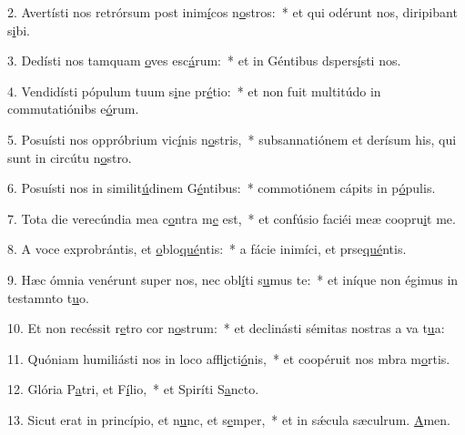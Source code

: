 2. Avertísti nos retrórsum post inim\uline{í}cos n\uline{o}stros:~* et qui odérunt nos, diripibant s\uline{i}bi.\par 
3. Dedísti nos tamquam \uline{o}ves esc\uline{á}rum:~* et in Géntibus dspers\uline{í}sti nos.\par 
4. Vendidísti pópulum tuum s\uline{i}ne pr\uline{é}tio:~* et non fuit multitúdo in commutatiónibs e\uline{ó}rum.\par 
5. Posuísti nos oppróbrium vic\uline{í}nis n\uline{o}stris,~* subsannatiónem et derísum his, qui sunt in circútu n\uline{o}stro.\par 
6. Posuísti nos in similit\uline{ú}dinem G\uline{é}ntibus:~* commotiónem cápits in p\uline{ó}pulis.\par 
7. Tota die verecúndia mea c\uline{o}ntra m\uline{e} est,~* et confúsio faciéi meæ coopru\uline{i}t me.\par 
8. A voce exprobrántis, et \uline{o}blo\uline{qué}ntis:~* a fácie inimíci, et prse\uline{qué}ntis.\par 
9. Hæc ómnia venérunt super nos, nec obl\uline{í}ti s\uline{u}mus te:~* et iníque non égimus in testamnto t\uline{u}o.\par 
10. Et non recéssit r\uline{e}tro cor n\uline{o}strum:~* et declinásti sémitas nostras a va t\uline{u}a:\par 
11. Quóniam humiliásti nos in loco affl\uline{i}cti\uline{ó}nis,~* et coopéruit nos mbra m\uline{o}rtis.\par 
12. Glória P\uline{a}tri, et F\uline{í}lio,~* et Spiríti S\uline{a}ncto.\par 
13. Sicut erat in princípio, et n\uline{u}nc, et s\uline{e}mper,~* et in sǽcula sæculrum. \uline{A}men.\par 
